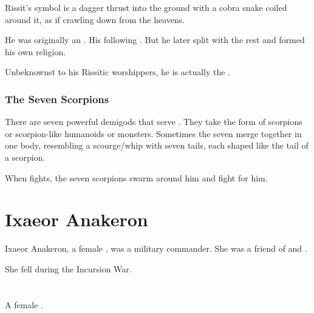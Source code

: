 Rissit's symbol is a dagger thrust into the ground with a cobra snake coiled around it, as if crawling down from the heavens. 

He was originally an . 
His following . 
But he later split with the rest and formed his own religion. 

Unbeknownst to his Rissitic worshippers, he is actually the \dragon{} . 



\subsubsection{The Seven Scorpions}
There are seven powerful \daemonic{} demigods that serve \Nechsain. They take the form of scorpions or scorpion-like humanoids or monsters. Sometimes the seven merge together in one body, resembling a scourge/whip with seven tails, each shaped like the tail of a scorpion. 

When \Nechsain{} fights, the seven scorpions swarm around him and fight for him.















\section{Ixaeor Anakeron}
Ixaeor Anakeron, a female \dragon, was a military commander. She was a friend of \Nexagglachel and \Iscrafel.

She fell during the Incursion War.














\section[Laccashyth]{\Laccashyth}
A female \dragon. 















